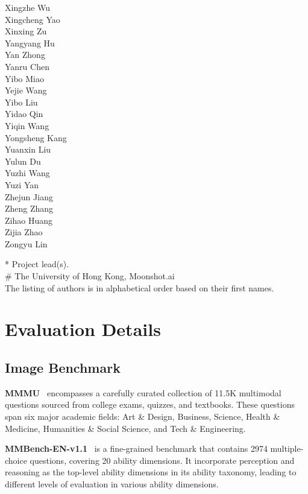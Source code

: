 \documentclass{article}
\newcommand{\citep}[1]{\parencite{#1}}
\begin{document}
\begin{multicols}{2}
Xingzhe Wu \\
Xingcheng Yao \\
Xinxing Zu \\
Yangyang Hu \\
Yan Zhong \\
Yanru Chen \\
Yibo Miao \\
Yejie Wang \\
Yibo Liu \\
Yidao Qin \\
Yiqin Wang \\
Yongsheng Kang \\
Yuanxin Liu\\
Yulun Du \\
Yuzhi Wang \\
Yuzi Yan \\
Zhejun Jiang \\
Zheng Zhang \\
Zihao Huang \\
Zijia Zhao \\
Zongyu Lin \\



\end{multicols}

* Project lead(s).\\
\# The University of Hong Kong, Moonshot.ai \\
The listing of authors is in alphabetical order based on their first names. 



\section{Evaluation Details}
\label{sec:appendix_eval_detail}



\subsection{Image Benchmark}

\textbf{MMMU}~\citep{yue2024mmmu} encompasses a carefully curated collection of 11.5K multimodal questions sourced from college exams, quizzes, and textbooks. These questions span six major academic fields: Art \& Design, Business, Science, Health \& Medicine, Humanities \& Social Science, and Tech \& Engineering.


\textbf{MMBench-EN-v1.1}~\citep{MMBench} is a fine-grained benchmark that contains 2974 multiple-choice questions, covering 20 ability dimensions. It incorporate perception and reasoning as the top-level ability dimensions in its ability taxonomy, leading to different levels of evaluation in various ability dimensions.
\end{document}
